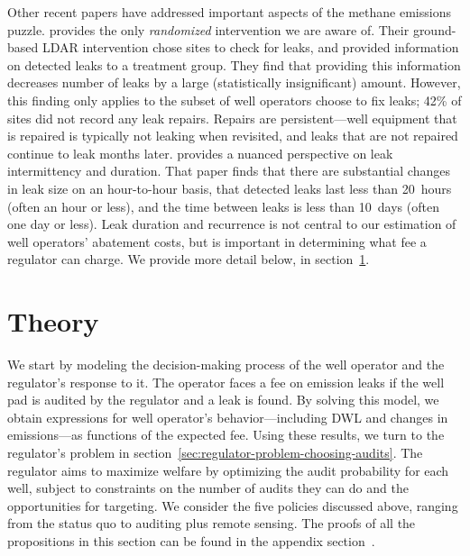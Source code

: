 Other recent papers have addressed important aspects of the methane emissions puzzle.
\textcite{Wang/Barlow/Funk/Robinson/Brandt/Ravikumar:2021}
provides the only \emph{randomized} intervention we are aware of.
Their ground-based \gls{LDAR} intervention chose sites to check for leaks, and provided information on detected leaks to a treatment group.
They find that providing this information decreases number of leaks by a large (statistically insignificant) amount.
However, this finding only applies to the subset of well operators choose to fix leaks; 42\% of sites did not record any leak repairs.
Repairs are persistent---well equipment that is repaired is typically not leaking when revisited, and leaks that are not repaired continue to leak months later.
\textcite{Wang/Daniels/Hammerling/Harrison/Burmaster/George/Ravikumar:2022} provides a nuanced perspective on leak intermittency and duration.
That paper finds that there are substantial changes in leak size on an hour-to-hour basis, that detected leaks last less than 20~hours (often an hour or less), and the time between leaks is less than 10~days (often one day or less).
Leak duration and recurrence is not central to our estimation of well operators' abatement costs, but is important in determining what fee a regulator can charge.
We provide more detail below, in section~\ref{sec:theory}.



\section{Theory}
\label{sec:theory}

We start by modeling the decision-making process of the well operator and the regulator's response to it.
The operator faces a fee on emission leaks if the well pad is audited by the regulator and a leak is found.
By solving this model, we obtain expressions for well operator's behavior---including \gls{DWL} and changes in emissions---as functions of the expected fee.
Using these results, we turn to the regulator's problem in section~\ref{sec:regulator-problem-choosing-audits}.
The regulator aims to maximize welfare by optimizing the audit probability for each well, subject to constraints on the number of audits they can do and the opportunities for targeting.
We consider the five policies discussed above, ranging from the status quo to auditing plus remote sensing.
The proofs of all the propositions in this section can be found in the appendix section~\iftoggle{usexr}{\ref{app:proofs}}{A1}.


